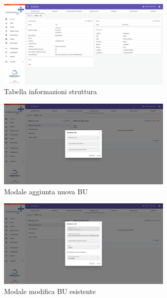 \newpage
\begin{figure}[H]
    \centering
    \includegraphics[width= 0.75\textwidth]{images/capitolo5/f1_f2_f3_websiteVisibility_email_links/TabInfo.png} 
    \caption{Tabella informazioni struttura} 
    \label{fig:TabInfo}
\end{figure}

\begin{figure}[H]
    \centering
    \includegraphics[width= 0.75\textwidth]{images/capitolo5/f1_f2_f3_websiteVisibility_email_links/ModalFacilityBusinessUnit_create.png} 
    \caption{Modale aggiunta nuova BU} 
    \label{fig:ModalFacilityBusinessUnit_create}
\end{figure}

\begin{figure}[H]
    \centering
    \includegraphics[width= 0.75\textwidth]{images/capitolo5/f1_f2_f3_websiteVisibility_email_links/ModalFacilityBusinessUnit_edit.png} 
    \caption{Modale modifica BU esistente} 
    \label{fig:ModalFacilityBusinessUnit_edit}
\end{figure}

